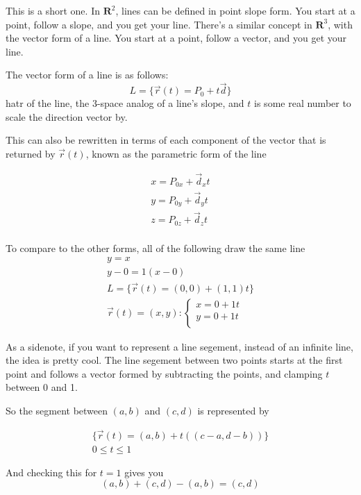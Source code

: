 \documentclass[12pt, letterpaper]{article}
\begin{document}
This is a short one. In $\mathbf{R}^2$, lines can be defined in point slope form. You start at a point, follow a slope, and you get your line. 
There's a similar concept in $\mathbf{R}^3$, with the vector form of a line. You start at a point, follow a vector, and you get your line.

The vector form of a line is as follows:
\begin{displaymath}
    L = \{\vec{r}(t) = P_0 + t\vec{d}\}
\end{displaymath}hatr of the line, the 3-space analog of a line's slope, and $t$ is some real number to scale the direction vector by.

This can also be rewritten in terms of each component of the vector that is returned by $\vec{r}(t)$, known as the parametric form of the line

\begin{gather*}
    x = P_{0x} + \vec{d}_xt\\
    y = P_{0y} + \vec{d}_yt\\
    z = P_{0z} + \vec{d}_zt\\
\end{gather*}


To compare to the other forms, all of the following draw the same line
\begin{gather*}
    y = x \\
    y - 0 = 1 (x - 0)\\
    L = \{\vec{r}(t) = (0, 0) + (1, 1)t\}\\
    \vec{r}(t)= (x, y): 
    \begin{cases}
        x = 0 + 1t\\
        y = 0 + 1t\\
    \end{cases}
\end{gather*}

As a sidenote, if you want to represent a line segement, instead of an infinite line, the idea is pretty cool. The line segement between two points starts at the first point and follows a vector formed by subtracting the points, and clamping $t$ between 0 and 1.

So the segment between $(a, b)$ and $(c, d)$ is represented by

\begin{gather*}
    \{\vec{r}(t) = (a,b) + t\left((c - a, d - b)\right)\}\\
    0 \leq t \leq 1
\end{gather*}

And checking this for $t = 1$ gives you 
\begin{displaymath}
    (a, b) + (c, d) - (a, b) = (c, d)
\end{displaymath}
\end{document}
